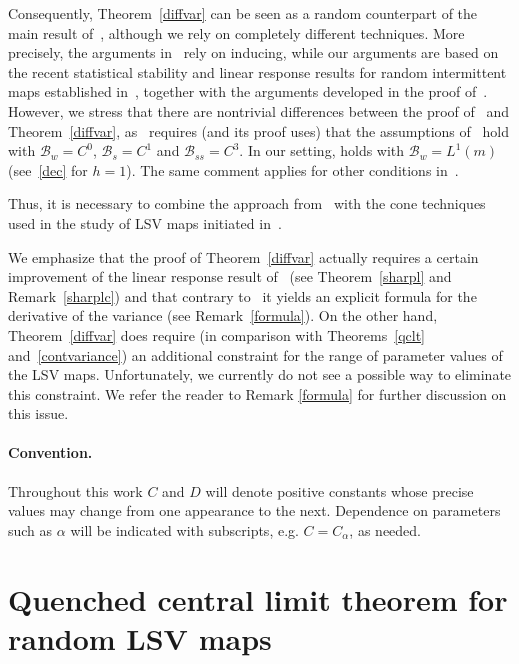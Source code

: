 \documentclass[12pt,reqno,a4paper]{article}
\begin{document}
	Consequently, Theorem~\ref{diffvar} can be seen as a random counterpart of the main result of~\cite{Selley}, although we rely on completely different techniques. More precisely, the arguments in~\cite{Selley} rely on inducing, while our arguments are based on the recent statistical stability and linear response results for random intermittent maps established in~\cite{DGTS}, together with the arguments developed in the proof of~\cite[Theorem 12]{DH2}. However, we stress that there are nontrivial differences between the proof of~\cite[Theorem 12]{DH2} and Theorem~\ref{diffvar}, as~\cite[Theorem 12]{DH2} requires (and its proof uses) that the assumptions of~\cite[Theorem 2]{DH2} hold with $\mathcal B_w=C^0$, $\mathcal B_s=C^1$ and $\mathcal B_{ss}=C^3$. In our setting, \cite[(4)]{DH2} holds with $\mathcal B_w=L^1(m)$ (see~\eqref{dec} for $h=1$). The same comment applies for other conditions in~\cite[Theorem 2]{DH2}.
	
	
	Thus, it is necessary to combine the approach from~\cite{DH2} with the cone techniques used in the study of LSV maps initiated in~\cite{LSV}.
	
	We emphasize that the proof of Theorem~\ref{diffvar} actually requires a certain improvement of the linear response result of~\cite{DGTS} (see Theorem~\ref{sharpl}
	and Remark~\ref{sharplc}) and that contrary to~\cite{Selley} it yields an explicit formula for the derivative of the variance (see Remark~\ref{formula}). On the other hand, Theorem~\ref{diffvar} does require (in comparison with Theorems~\ref{qclt} and~\ref{contvariance}) an additional constraint for the range of parameter values of the LSV maps. Unfortunately, we currently do not see a possible way to eliminate this constraint. We refer the 
	reader to Remark \ref{formula} for further discussion on this issue.
	
	
	\paragraph{\textbf{Convention.}} Throughout this work $C$ and $D$ will denote positive constants whose precise values may change from one appearance to the next. Dependence on parameters such as $\alpha$ will be indicated with subscripts, e.g. $C=C_\alpha$, as needed.
	\section{Quenched central limit theorem for random LSV maps}\label{sec:clt}
	
\end{document}

